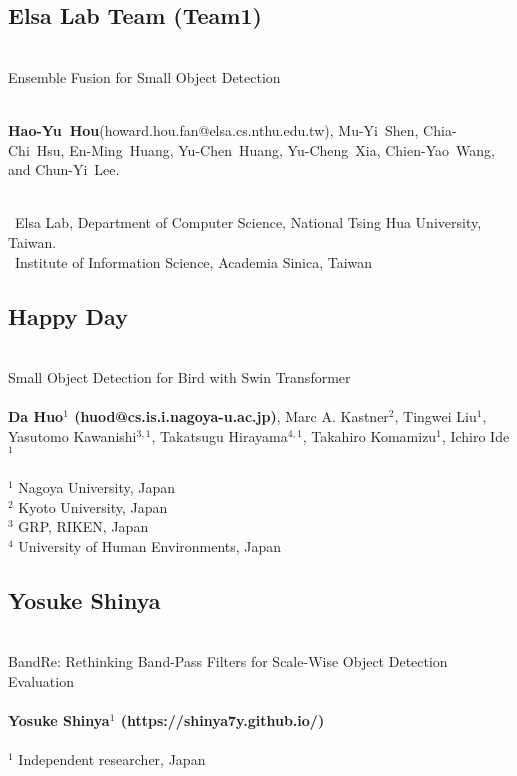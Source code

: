 \documentclass{mva_style}
\begin{document}
\subsection*{Elsa Lab Team (Team1)}

\\Ensemble Fusion for Small Object Detection

\\\textbf{Hao-Yu~Hou}\footnotemark[1]\newline(howard.hou.fan@elsa.cs.nthu.edu.tw),
{Mu-Yi~Shen}\footnotemark[1],
{Chia-Chi~Hsu}\footnotemark[1],
{En-Ming~Huang}\footnotemark[1],
{Yu-Chen~Huang}\footnotemark[1],
{Yu-Cheng~Xia}\footnotemark[1],
Chien-Yao~Wang\footnotemark[2], and
Chun-Yi~Lee\footnotemark[1].

\\
\noindent\footnotemark[1]~Elsa Lab, Department of Computer Science, National Tsing Hua University, Taiwan.\\
\noindent\footnotemark[2]~Institute of Information Science, Academia Sinica, Taiwan

\subsection*{Happy Day}
\\Small Object Detection for Bird with Swin Transformer\\
\\ \textbf{Da Huo$^1$ (huod@cs.is.i.nagoya-u.ac.jp)}, Marc A. Kastner$^2$, Tingwei Liu$^1$, Yasutomo Kawanishi$^{3,1}$, Takatsugu Hirayama$^{4,1}$, Takahiro Komamizu$^1$, Ichiro Ide$^1$\\
\\
$^1$ Nagoya University, Japan\\
$^2$ Kyoto University, Japan\\
$^3$ GRP, RIKEN, Japan\\
$^4$ University of Human Environments, Japan\\

\subsection*{Yosuke Shinya}
\\ BandRe: Rethinking Band-Pass Filters for Scale-Wise Object Detection Evaluation\\
\\ \textbf{Yosuke Shinya$^1$ (https://shinya7y.github.io/)}\\
\\
$^1$ Independent researcher, Japan\\
\end{document}
